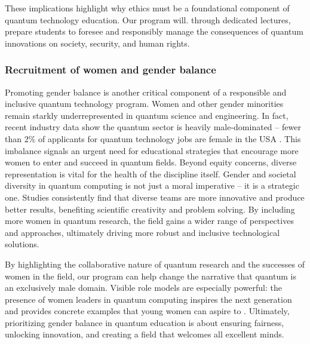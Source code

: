 \documentclass{scrreprt}
\begin{document}
These implications highlight why ethics must be a foundational
component of quantum technology education. Our %
program will. through dedicated lectures, 
prepare students to foresee and responsibly manage the consequences of
quantum innovations on society, security, and human rights.


\subsubsection{Recruitment of women and gender balance}

Promoting gender balance is another critical component of a
responsible and inclusive quantum technology program. Women and other
gender minorities remain starkly underrepresented in quantum science
and engineering. In fact, recent industry data show the quantum sector
is heavily male-dominated – fewer than $2\%$ of applicants for quantum
technology jobs are female in the USA \cite{workforce}. This imbalance signals an urgent need for
educational strategies that encourage more women to enter and succeed
in quantum fields. Beyond equity concerns, diverse representation is
vital for the health of the discipline itself. Gender and societal diversity in
quantum computing is not just a moral imperative – it is  a strategic one. 
Studies consistently find that diverse teams are more innovative and
produce better results, benefiting scientific creativity and
problem solving. By including more women in quantum research, the field
gains a wider range of perspectives and approaches, ultimately driving
more robust and inclusive technological solutions.


By highlighting the collaborative nature of quantum research and the
successes of women in the field, our program can help change the
narrative that quantum is an exclusively male domain. Visible role
models are especially powerful: the presence of women leaders in
quantum computing inspires the next generation and provides concrete
examples that young women can aspire to . Ultimately, prioritizing
gender balance in quantum education is about ensuring fairness,
unlocking innovation, and creating a field that welcomes all excellent
minds.
\end{document}

